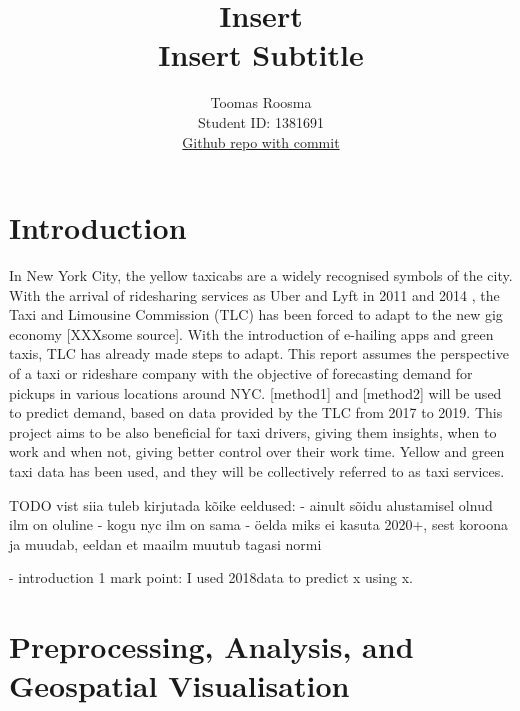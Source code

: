 \documentclass[11pt]{article}
\title{\textbf{Insert} \\ Insert Subtitle}
\author{
Toomas Roosma \\
Student ID: 1381691 \\
\href{https://github.com/MAST30034-Applied-Data-Science/mast30034\_p1\_template/tree/fd9f1dd17fdbcb5b119b70c93a22da8210d44fd7}{Github repo with commit}
}
\begin{document}
\maketitle

\section{Introduction}
In  New York City, the yellow taxicabs are a widely recognised symbols of the city. 
With the arrival of ridesharing services as Uber and Lyft in 2011 \cite{uberStartDate} and 2014 \cite{lyftStartDate} , the Taxi and Limousine Commission (TLC) has been forced to adapt to the new 
gig economy [XXXsome source]. With the introduction of e-hailing apps and green taxis, TLC has already made steps to adapt. This report
assumes the perspective of a taxi or rideshare company with the objective of forecasting demand for pickups in various locations around NYC.
[method1] and [method2] will be used to predict demand, based on data provided by the TLC from 2017 to 2019. This project aims to be also beneficial for taxi drivers, giving them insights, when to work and when not, giving better control over their work time. Yellow and green taxi data has been used, and they will be collectively referred to as taxi services.



TODO vist siia tuleb kirjutada kõike eeldused:
    - ainult sõidu alustamisel olnud ilm on oluline
    - kogu nyc ilm on sama
    - öelda miks ei kasuta 2020+, sest koroona ja muudab, eeldan et maailm muutub tagasi normi

    - introduction 1 mark point: I used 2018data to predict x using x. 




\section{Preprocessing, Analysis, and Geospatial Visualisation}
\end{document}
